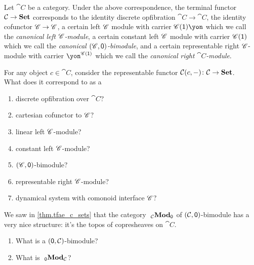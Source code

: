 \documentclass[Book-Poly]{subfiles}
\begin{document}
Let $\cat{C}$ be a category. Under the above correspondence, the terminal functor $\mathcal{C}\to\mathbf{Set}$ corresponds to the identity discrete opfibration $\cat{C}\to\cat{C}$, the identity cofunctor $\mathscr{C}\to\mathscr{C}$, a certain left $\mathscr{C}$ module with carrier $\com{C}(\1)\yon$ which we call the \emph{canonical left $\mathscr{C}$-module}, a certain constant left $\mathscr{C}$ module with carrier $\mathscr{C}(\textsf{1})$ which we call the \emph{canonical $(\mathscr{C},\textsf{0})$-bimodule}, and a certain representable right $\mathscr{C}$-module with carrier $\yon^{\com{C}(\1)}$ which we call the \emph{canonical right $\cat{C}$-module}.

\begin{exercise}
For any object $c\in \cat{C}$, consider the representable functor $\mathcal{C}(c,-)\colon\mathcal{C}\to\mathbf{Set}$. What does it correspond to as a
\begin{enumerate}
	\item discrete opfibration over $\cat{C}$?
	\item cartesian cofunctor to $\mathscr{C}$?
	\item linear left $\mathscr{C}$-module?
	\item constant left $\mathscr{C}$-module?
	\item $(\mathscr{C},\textsf{0})$-bimodule?
	\item representable right $\mathscr{C}$-module?
	\item dynamical system with comonoid interface $\mathscr{C}$?
\qedhere
\end{enumerate}
\end{exercise}

\begin{exercise}
We saw in \cref{thm.tfae_c_sets} that the category $~_{\mathcal{C}}\mathbf{Mod}_{\textsf{0}}$ of $(\mathcal{C},\textsf{0})$-bimodule has a very nice structure: it's the topos of copresheaves on $\cat{C}$. 
\begin{enumerate}
	\item What is a $(\textsf{0},\mathcal{C})$-bimodule?
	\item What is $~_{\textsf{0}}\mathbf{Mod}_{\mathcal{C}}$?
\qedhere
\end{enumerate}
\end{exercise}
\end{document}

